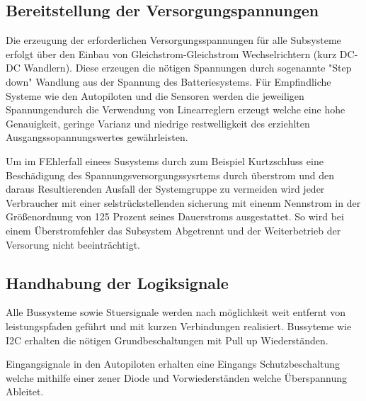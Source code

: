 \subsection{Bereitstellung der Versorgungspannungen}

Die erzeugung der erforderlichen Versorgungsspannungen für alle Subsysteme erfolgt über den Einbau von Gleichstrom-Gleichstrom Wechselrichtern (kurz DC-DC Wandlern).
Diese erzeugen die nötigen Spannungen durch sogenannte "Step down"  Wandlung aus der Spannung des Batteriesystems.
Für Empfindliche Systeme wie den Autopiloten und die Sensoren werden die jeweiligen Spannungendurch die Verwendung von Linearreglern erzeugt welche eine hohe Genauigkeit, geringe Varianz und niedrige restwelligkeit des erziehlten Ausgangssopannungswertes gewährleisten.

Um im FEhlerfall einees Susystems durch zum Beispiel Kurtzschluss eine Beschädigung des Spannungsversorgungssysrtems durch überstrom und den daraus Resultierenden Ausfall der Systemgruppe zu vermeiden wird jeder Verbraucher mit einer selstrückstellenden sicherung mit einenm Nennstrom in der Größenordnung von 125 Prozent seines Dauerstroms ausgestattet.
So wird bei einem Überstromfehler das Subsystem Abgetrennt und der Weiterbetrieb der Versorung nicht beeinträchtigt.


\subsection{Handhabung der Logiksignale}

Alle Bussysteme sowie Stuersignale werden nach möglichkeit weit entfernt von leistungspfaden geführt und mit kurzen Verbindungen realisiert.
Bussyteme wie I2C erhalten die nötigen Grundbeschaltungen mit Pull up Wiederständen.

Eingangsignale in den Autopiloten erhalten eine Eingangs Schutzbeschaltung welche mithilfe einer zener Diode und Vorwiederständen welche Überspannung Ableitet.